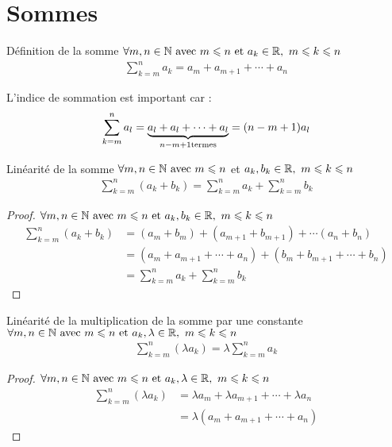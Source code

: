 \section{Sommes}
\begin{definition}{Définition de la somme}
	$\forall m, n \in \mathbb{N} \textnormal{ avec } m \leqslant n \textnormal{ et } a_k \in \mathbb{R}, \ m \leqslant k \leqslant n$
	\begin{align*}
		\sum_{k = m}^{n}a_k = a_m + a_{m+1} + \cdots + a_n
	\end{align*}
\end{definition}

\begin{remarque}
	L'indice de sommation est important car :
	\begin{align*}
		\sum_{k = m}^{n}a_l = \underbrace{a_l + a_l + \cdots + a_l}_{n - m + 1 \textnormal{termes}} = (n - m + 1)a_l
	\end{align*}
\end{remarque}
\begin{proposition}{Linéarité de la somme}
	$\forall m, n \in \mathbb{N} \textnormal{ avec } m \leqslant n$ et $a_k, b_k \in \mathbb{R}, \ m \leqslant k \leqslant n$
	\begin{align*}
		\sum_{k = m}^{n} (a_k + b_k) = \sum_{k=m}^{n}a_k + \sum_{k=m}^{n}b_k
	\end{align*}
\end{proposition}
\begin{proof}
	$\forall m, n \in \mathbb{N} \textnormal{ avec } m \leqslant n \textnormal{ et } a_k, b_k \in \mathbb{R}, \ m \leqslant k \leqslant n$
	\begin{align*}
		\sum_{k = m}^{n} (a_k + b_k) &= (a_m + b_m) + (a_{m+1} + b_{m+1}) + \cdots (a_n + b_n)\\
		&= (a_m + a_{m+1} + \cdots + a_n) + (b_m + b_{m+1} + \cdots + b_n) \\
		&= \sum_{k=m}^{n}a_k + \sum_{k=m}^{n}b_k
	\end{align*}
\end{proof}
\begin{proposition}{Linéarité de la multiplication de la somme par une constante}
	$\forall m, n \in \mathbb{N} \textnormal{ avec } m \leqslant n \textnormal{ et } a_k, \lambda \in \mathbb{R}, \ m \leqslant k \leqslant n$
	\begin{align*}
		\sum_{k = m}^{n} (\lambda a_k) = \lambda \sum_{k = m}^{n} a_k
	\end{align*}
\end{proposition}
\begin{proof}
	$\forall m, n \in \mathbb{N} \textnormal{ avec } m \leqslant n \textnormal{ et } a_k, \lambda \in \mathbb{R}, \ m \leqslant k \leqslant n$
	\begin{align*}
		\sum_{k = m}^{n} (\lambda a_k) &=  \lambda a_m + \lambda a_{m+1} + \cdots + \lambda a_n \\
		&= \lambda (a_m + a_{m+1} + \cdots + a_n)
	\end{align*}
\end{proof}
